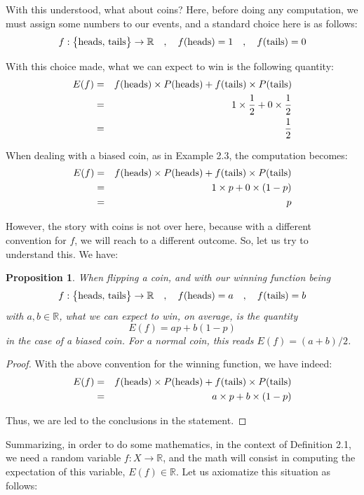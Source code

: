 \documentclass[12pt]{amsbook}
\newtheorem{proposition}[theorem]{Proposition}
\begin{document}
With this understood, what about coins? Here, before doing any computation, we must assign some numbers to our events, and a standard choice here is as follows:
$$f:\big\{{\rm heads},\,{\rm tails}\big\}\to\mathbb R\quad,\quad f({\rm heads})=1\quad,\quad f({\rm tails})=0$$ 

With this choice made, what we can expect to win is the following quantity:
\begin{eqnarray*}
E(f)
&=&f({\rm heads})\times P({\rm heads})+f({\rm tails})\times P({\rm tails})\\
&=&1\times\frac{1}{2}+0\times\frac{1}{2}\\
&=&\frac{1}{2}
\end{eqnarray*}

When dealing with a biased coin, as in Example 2.3, the computation becomes:
\begin{eqnarray*}
E(f)
&=&f({\rm heads})\times P({\rm heads})+f({\rm tails})\times P({\rm tails})\\
&=&1\times p+0\times(1-p)\\
&=&p
\end{eqnarray*}

However, the story with coins is not over here, because with a different convention for $f$, we will reach to a different outcome. So, let us try to understand this. We have:

\begin{proposition}
When flipping a coin, and with our winning function being
$$f:\big\{{\rm heads},\,{\rm tails}\big\}\to\mathbb R\quad,\quad f({\rm heads})=a\quad,\quad f({\rm tails})=b$$
with $a,b\in\mathbb R$, what we can expect to win, on average, is the quantity
$$E(f)=ap+b(1-p)$$
in the case of a biased coin. For a normal coin, this reads $E(f)=(a+b)/2$.
\end{proposition}

\begin{proof}
With the above convention for the winning function, we have indeed:
\begin{eqnarray*}
E(f)
&=&f({\rm heads})\times P({\rm heads})+f({\rm tails})\times P({\rm tails})\\
&=&a\times p+b\times(1-p)
\end{eqnarray*}

Thus, we are led to the conclusions in the statement.
\end{proof}

Summarizing, in order to do some mathematics, in the context of Definition 2.1, we need a random variable $f:X\to\mathbb R$, and the math will consist in computing the expectation of this variable, $E(f)\in\mathbb R$. Let us axiomatize this situation as follows:
\end{document}
